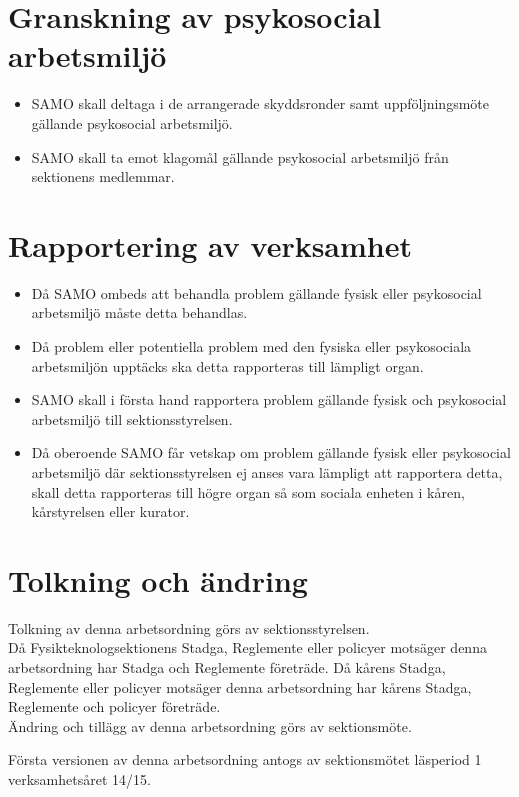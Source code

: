 \section{Granskning av psykosocial arbetsmiljö}
\begin{itemize}
\item SAMO skall deltaga i de arrangerade skyddsronder samt uppföljningsmöte gällande psykosocial arbetsmiljö.

\item SAMO skall ta emot klagomål gällande psykosocial arbetsmiljö från sektionens medlemmar.
\end{itemize}

\section{Rapportering av verksamhet}
\begin{itemize}
\item Då SAMO ombeds att behandla problem gällande fysisk eller psykosocial arbetsmiljö måste detta behandlas.

\item Då problem eller potentiella problem med den fysiska eller psykosociala arbetsmiljön upptäcks ska detta rapporteras till lämpligt organ.

\item SAMO skall i första hand rapportera problem gällande fysisk och psykosocial arbetsmiljö till sektionsstyrelsen.

\item Då oberoende SAMO får vetskap om problem gällande fysisk eller psykosocial arbetsmiljö där sektionsstyrelsen ej anses vara lämpligt att rapportera detta, skall detta rapporteras till högre organ så som sociala enheten i kåren, kårstyrelsen eller kurator.

\end{itemize}

\section{Tolkning och ändring}
Tolkning av denna arbetsordning görs av sektionsstyrelsen.\\ Då Fysikteknologsektionens Stadga, Reglemente eller policyer motsäger denna arbetsordning har Stadga och Reglemente företräde. Då kårens Stadga, Reglemente eller policyer motsäger denna arbetsordning har kårens Stadga, Reglemente och policyer företräde.\\
Ändring och tillägg av denna arbetsordning görs av sektionsmöte.


Första versionen av denna arbetsordning antogs av sektionsmötet läsperiod 1 verksamhetsåret 14/15.

\newpage
